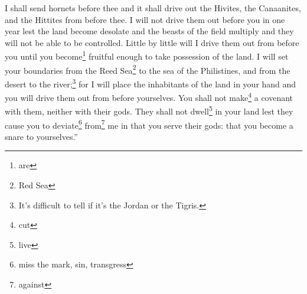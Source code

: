 \begin{enumerate*}[mode=unboxed]
     I shall send hornets before thee and it shall drive out the Hivites, the Canaanites, and the Hittites from before thee.%
     I will not drive them out before you in one year lest the land become desolate and the beasts of the field multiply and they will not be able to be controlled.%
     Little by little will I drive them out from before you until you become\footnote{are} fruitful enough to take possession of the land.%
     I will set your boundaries from the Reed Sea\footnote{Red Sea} to the sea of the Philistines, and from the desert to the river;\footnote{It's difficult to tell if it's the Jordan or the Tigris.} for I will place the inhabitants of the land in your hand and you will drive them out from before yourselves.%
     You shall not make\footnote{cut} a covenant with them, neither with their gods.%
     They shall not dwell\footnote{live} in your land lest they cause you to deviate\footnote{miss the mark, sin, transgress} from\footnote{against} me in that you serve their gods: that you become a snare to yourselves.''%
\end{enumerate*}
